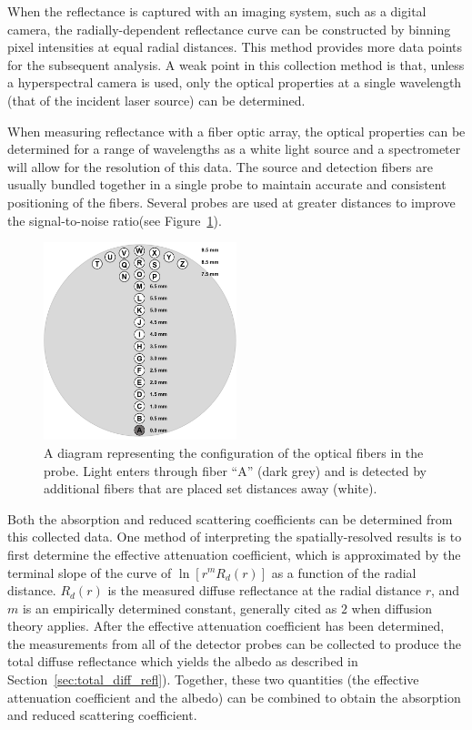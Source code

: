 When the reflectance is captured with an imaging system, such as a digital camera, the radially-dependent reflectance curve can be constructed by binning pixel intensities at equal radial distances. This method provides more data points for the subsequent analysis. A weak point in this collection method is that, unless a hyperspectral camera is used, only the optical properties at a single wavelength (that of the incident laser source) can be determined.

When measuring reflectance with a fiber optic array, the optical properties can be determined for a range of wavelengths as a white light source and a spectrometer will allow for the resolution of this data. The source and detection fibers are usually bundled together in a single probe to maintain accurate and consistent positioning of the fibers. Several probes are used at greater distances to improve the signal-to-noise ratio(see Figure~\ref{fig:intro-srdr}).

\begin{figure}
	\centering \includegraphics[width=0.5\textwidth]{figures/intro-srdr.png}
	\caption[Probe for spatially-resolved diffuse reflectance]{\label{fig:intro-srdr}A diagram representing the configuration of the optical fibers in the probe. Light enters through fiber “A” (dark grey) and is detected by additional fibers that are placed set distances away (white).}
\end{figure}

Both the absorption and reduced scattering coefficients can be determined from this collected data. One method of interpreting the spatially-resolved results is to first determine the effective attenuation coefficient, which is approximated by the terminal slope of the curve of $\ln[r^m R_d(r)] $ as a function of the radial distance. $R_d(r)$ is the measured diffuse reflectance at the radial distance $r$, and $m$ is an empirically determined constant, generally cited as $2$ when diffusion theory applies. After the effective attenuation coefficient has been determined, the measurements from all of the detector probes can be collected to produce the total diffuse reflectance which yields the albedo as described in Section~\ref{sec:total_diff_refl}). Together, these two quantities (the effective attenuation coefficient and the albedo) can be combined to obtain the absorption and reduced scattering coefficient.

